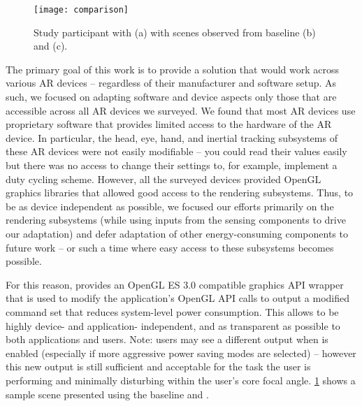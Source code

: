 \begin{figure}
    \centering
    \texttt{[image: comparison]}
    \vspace{-4ex}
    \caption{Study participant with {\mlo} (a) with scenes observed from baseline (b) and {\myit} (c).}
    \label{fig:comparison}
\end{figure}



The primary goal of this work is to provide a solution that would work across 
various AR devices -- regardless of their manufacturer and software setup.
%
As such, we focused on adapting software and device aspects only those that
are accessible across all AR devices we surveyed. 
%
We found that most AR devices use proprietary software that
provides limited access to the hardware of the AR device. 
%
In particular, the head, eye, hand, and inertial tracking subsystems of these
AR devices were not easily modifiable -- you could read their values easily
but there was no access to change their settings to, for example, 
implement a duty cycling scheme.
%
However, all the surveyed devices provided OpenGL graphics libraries that
allowed good access to the rendering subsystems. Thus, to be as device 
independent as possible, we focused our efforts primarily on the rendering 
subsystems (while using inputs from the sensing components to drive our
adaptation) and defer adaptation of other energy-consuming components to 
future work -- or such a time where easy access to these subsystems becomes 
possible.

For this reason, {\myit} provides an OpenGL ES 3.0 compatible graphics API 
wrapper that is used to modify the application's OpenGL API calls to output 
a modified command set that reduces system-level power consumption.
%
This allows {\myit} to be highly device- and application- independent, 
and as transparent as possible to both applications and users.
%
Note: users may see a different output when {\myit} is enabled (especially if 
more aggressive power saving modes are selected) 
-- however this new output is still sufficient and acceptable for the task 
the user is performing and minimally disturbing within the user's core focal angle.
%
\fig\ref{fig:comparison} shows a sample scene presented using the baseline and {\myit}.



